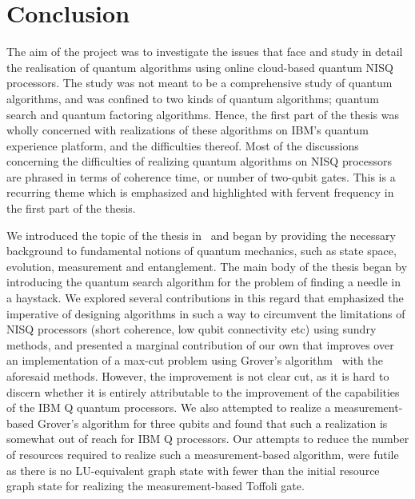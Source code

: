 \chapter{Conclusion}

The aim of the project was to investigate the issues that face and study in detail the realisation of quantum algorithms using online cloud-based quantum \acs{NISQ} processors. The study was not meant to be a comprehensive study of quantum algorithms, and was confined to two kinds of quantum algorithms; quantum search and quantum factoring algorithms. Hence, the first part of the thesis was wholly concerned with realizations of these algorithms on IBM’s quantum experience platform, and the difficulties thereof. Most of the discussions concerning the difficulties of realizing quantum algorithms on \acs{NISQ} processors are phrased in terms of coherence time, or number of two-qubit gates. This is a recurring theme which is emphasized and highlighted with fervent frequency in the first part of the thesis.

\bigskip
\noindent
We introduced the topic of the thesis in~ and began  by providing the necessary background to fundamental notions of quantum mechanics, such as state space, evolution, measurement and entanglement. The main body of the thesis began  by introducing the quantum search algorithm for the problem of finding a needle in a haystack. We explored several contributions in this regard that emphasized the imperative of designing algorithms in such a way to circumvent the limitations of \acs{NISQ} processors (short coherence, low qubit connectivity etc) using sundry methods, and presented a marginal contribution of our own that improves over an implementation of a \acs{max-cut} problem using Grover's algorithm~\cite{Satoh_2020} with the aforesaid methods.  However, the improvement is not clear cut, as it is hard to discern whether it is entirely attributable to the improvement of the capabilities of the IBM Q quantum processors. We also attempted to realize a measurement-based Grover's algorithm for three qubits and found that such a realization is somewhat out of reach for IBM Q processors. Our attempts to reduce the number of resources required to realize such a measurement-based algorithm, were futile as there is no \acs{LU}-equivalent graph state with fewer than the initial resource graph state for realizing the measurement-based Toffoli gate. 

